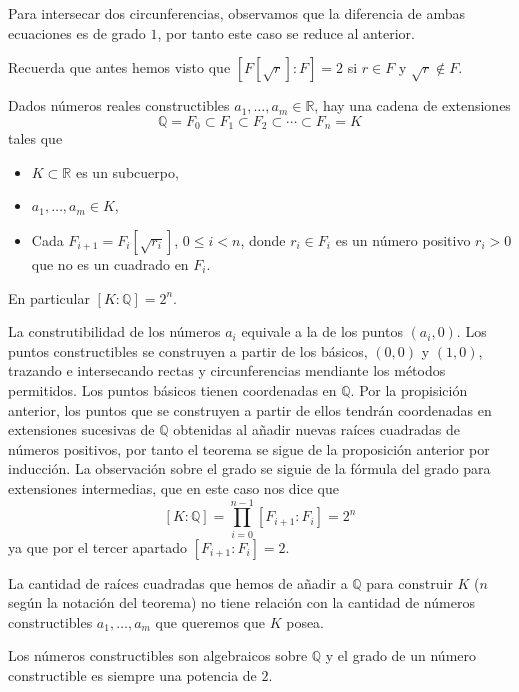 Para intersecar dos circunferencias, observamos que la diferencia de
ambas ecuaciones es de grado \(1\), por tanto este caso se reduce al
anterior.


Recuerda que antes hemos visto que \([F[\sqrt{r}]:F]=2\) si \(r\in F\) y
\(\sqrt{r}\notin F\).


Dados números reales constructibles \(a_1,\dots,a_m\in\mathbb R\), hay
una cadena de extensiones
\[\mathbb Q=F_0\subset F_1\subset F_2\subset\cdots\subset F_n=K\]
tales que

\begin{itemize}
\item
  \(K\subset\mathbb R\) es un subcuerpo,
\item
  \(a_1,\dots,a_m\in K\),
\item
  Cada \(F_{i+1}=F_i[\sqrt{r_i}]\), \(0\leq i{<}n\), donde
  \(r_i\in F_i\) es un número positivo \(r_i>0\) que no es un
  cuadrado en \(F_i\).
\end{itemize}

En particular \([K:\mathbb Q]=2^n\). 


La construtibilidad de los números \(a_i\) equivale a la de los puntos
\((a_i,0)\). Los puntos constructibles se construyen a partir de los
básicos, \((0,0)\) y \((1,0)\), trazando e intersecando rectas y
circunferencias mendiante los métodos permitidos. Los puntos básicos
tienen coordenadas en \(\mathbb Q\). Por la propisición anterior, los
puntos que se construyen a partir de ellos tendrán coordenadas en
extensiones sucesivas de \(\mathbb Q\) obtenidas al añadir nuevas raíces
cuadradas de números positivos, por tanto el teorema se sigue de la
proposición anterior por inducción. La observación sobre el grado se
siguie de la fórmula del grado para extensiones intermedias, que en este
caso nos dice que
\[[K:\mathbb Q]=\prod_{i=0}^{n-1}[F_{i+1}:F_i]=2^n\] ya que por el
tercer apartado \([F_{i+1}:F_i]=2\). 

La cantidad de raíces cuadradas que hemos de añadir a \(\mathbb Q\) para
construir \(K\) (\(n\) según la notación del teorema) no tiene relación
con la cantidad de números constructibles \(a_1,\dots,a_m\) que
queremos que \(K\) posea.


Los números constructibles son algebraicos sobre \(\mathbb Q\) y el
grado de un número constructible es siempre una potencia de \(2\).


